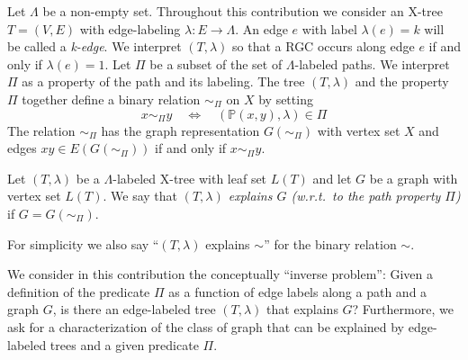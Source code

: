 \documentclass[smallextended]{svjour3}
\begin{document}
Let $\Lambda$ be a non-empty set. Throughout this contribution we consider
an X-tree $T=(V,E)$ with edge-labeling $\lambda \colon E\to \Lambda$. An
edge $e$ with label $\lambda(e)=k$ will be called a \emph{k-edge}. We
interpret $(T,\lambda)$ so that a RGC occurs along edge $e$ if and only if
$\lambda(e)=1$. Let $\Pi$ be a subset of the set of $\Lambda$-labeled
paths. We interpret $\Pi$ as a property of the path and its labeling. The
tree $(T,\lambda)$ and the property $\Pi$ together define a binary relation
$\sim_{\Pi}$ on $X$ by setting
\begin{equation}
  x\sim_{\Pi} y \quad\iff\quad (\mathbb{P}(x,y),\lambda) \in \Pi 
\end{equation} 
The relation $\sim_{\Pi}$ has the graph representation $G(\sim_{\Pi})$ with
vertex set $X$ and edges $xy\in E(G(\sim_{\Pi}))$ if and only if
$x\sim_{\Pi} y$.

\begin{definition}
  Let $(T,\lambda)$ be a $\Lambda$-labeled X-tree with leaf set $L(T)$ and 
  let $G$ be a graph with vertex set $L(T)$. We say that 
  \emph{$(T,\lambda)$ explains $G$ (w.r.t.\ to the path property $\Pi$)}
  if $G=G(\sim_{\Pi})$.
\end{definition}
For simplicity we also say ``$(T,\lambda)$ explains $\sim$'' for the binary
relation $\sim$.

We consider in this contribution the conceptually ``inverse problem'':
Given a definition of the predicate $\Pi$ as a function of edge labels
along a path and a graph $G$, is there an edge-labeled tree $(T,\lambda)$
that explains $G$? Furthermore, we ask for a characterization of the class
of graph that can be explained by edge-labeled trees and a given predicate
$\Pi$.
\end{document}
